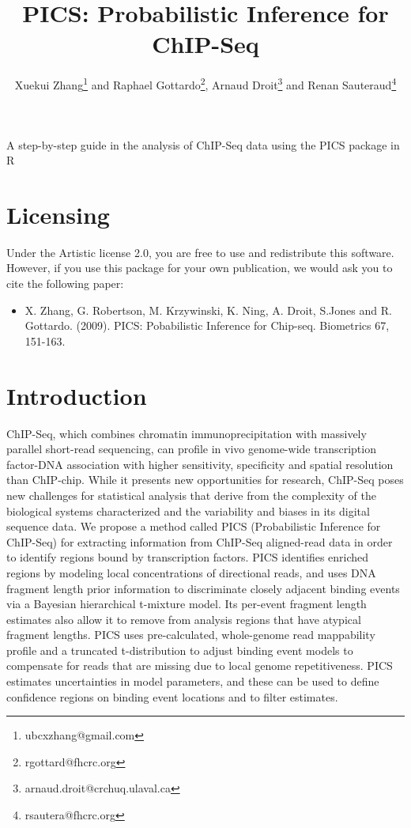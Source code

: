 \documentclass[a4paper]{article}
\title{PICS: Probabilistic Inference for ChIP-Seq}
\author{Xuekui Zhang\footnote{ubcxzhang@gmail.com} and Raphael
  Gottardo\footnote{rgottard@fhcrc.org}, Arnaud Droit\footnote{arnaud.droit@crchuq.ulaval.ca} and Renan Sauteraud\footnote{rsautera@fhcrc.org}}
\begin{document}
\maketitle



\textnormal {\normalfont}
A step-by-step guide in the analysis of ChIP-Seq data using the PICS package in R

\tableofcontents
\newpage


\section{Licensing}

Under the Artistic license 2.0, you are free to use and redistribute this software. However, if you use this package for your own publication, we would ask you to cite the following paper:

\begin{itemize}
\item[] X. Zhang, G. Robertson, M. Krzywinski, K. Ning, A. Droit, S.Jones and R. Gottardo. (2009). PICS: Pobabilistic Inference for Chip-seq. Biometrics 67, 151-163.
\end{itemize}


\section{Introduction}
ChIP-Seq, which combines chromatin immunoprecipitation with massively parallel
short-read sequencing, can profile in vivo genome-wide transcription
factor-DNA association with higher sensitivity, specificity and spatial
resolution than ChIP-chip. While it presents new opportunities for research,
ChIP-Seq poses new challenges for statistical analysis that derive from the
complexity of the biological systems characterized and the variability and
biases in its digital sequence data. We propose a method called PICS
(Probabilistic Inference for ChIP-Seq) for extracting information from
ChIP-Seq aligned-read data in order to identify regions bound by transcription
factors. PICS identifies enriched regions by modeling local concentrations of
directional reads, and uses DNA fragment length prior information to
discriminate closely adjacent binding events via a Bayesian hierarchical
t-mixture model. Its per-event fragment length estimates also allow it to
remove from analysis regions that have atypical fragment lengths. PICS uses
pre-calculated, whole-genome read mappability profile and a truncated
t-distribution to adjust binding event models to compensate for reads that are
missing due to local genome repetitiveness. PICS estimates uncertainties in
model parameters, and these can be used to define confidence regions on binding event locations and to filter estimates. 
\end{document}

